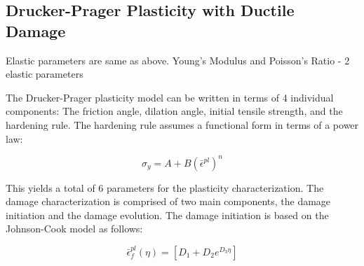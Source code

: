 \subsection{Drucker-Prager Plasticity with Ductile Damage}

Elastic parameters are same as above. Young's Modulus and Poisson's
Ratio - 2 elastic parameters

The Drucker-Prager plasticity model can be written in terms of 4 individual
components: The friction angle, dilation angle, initial tensile strength,
and the hardening rule. The hardening rule assumes a functional form
in terms of a power law:

\begin{equation}
\sigma_{y}=A+B\left(\bar{\epsilon}^{pl}\right)^{n}\label{eqn:param5}
\end{equation}


This yields a total of 6 parameters for the plasticity characterization.
The damage characterization is comprised of two main components,
the damage initiation and the damage evolution. The damage initiation
is based on the Johnson-Cook model as follows: 

\begin{equation}
\bar{\epsilon}_{f}^{pl}\left(\eta\right)=\left[D_{1}+D_{2}e^{D_{3}\eta}\right]\label{eqn:param6}
\end{equation}
